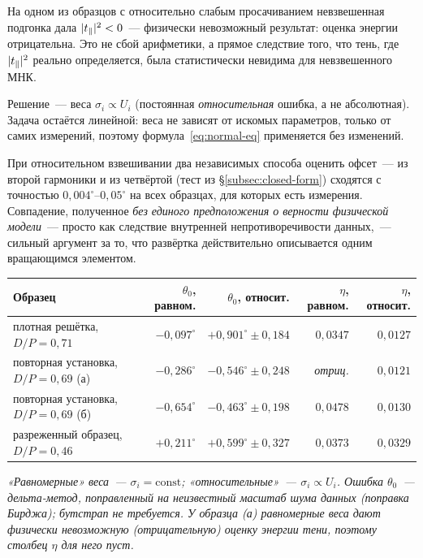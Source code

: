 \begin{example}
На одном из образцов с относительно слабым просачиванием невзвешенная подгонка дала
$|t_{\parallel}|^2<0$~--- физически невозможный результат: оценка энергии отрицательна. Это не сбой
арифметики, а прямое следствие того, что тень, где $|t_{\parallel}|^2$ реально определяется, была
статистически невидима для невзвешенного МНК.
\end{example}

\noindent
Решение~--- веса $\sigma_i\propto U_i$ (постоянная \emph{относительная} ошибка, а не абсолютная).
Задача остаётся линейной: веса не зависят от искомых параметров, только от самих измерений,
поэтому формула~\eqref{eq:normal-eq} применяется без изменений.

\begin{example}
При относительном взвешивании два независимых способа оценить офсет~--- из второй гармоники и из
четвёртой (тест из §\ref{subsec:closed-form}) сходятся с точностью
$0{,}004^\circ$--$0{,}05^\circ$ на всех образцах, для которых есть измерения. Совпадение,
полученное \emph{без единого предположения о верности физической модели}~--- просто как следствие
внутренней непротиворечивости данных,~--- сильный аргумент за то, что развёртка действительно
описывается одним вращающимся элементом.
\end{example}

\begin{center}
\footnotesize
\setlength{\tabcolsep}{6pt}
\begin{tabular}{@{}lrrrr@{}}
\toprule
\textbf{Образец} & \textbf{$\theta_0$, равном.} & \textbf{$\theta_0$, относит.} & \textbf{$\eta$,
равном.} & \textbf{$\eta$, относит.}\\
\midrule
плотная решётка, $D/P=0{,}71$        & $-0{,}097^\circ$ & $+0{,}901^\circ\pm0{,}184$ & $0{,}0347$ & $0{,}0127$ \\
повторная установка, $D/P=0{,}69$ (а) & $-0{,}286^\circ$ & $-0{,}546^\circ\pm0{,}248$ & \emph{отриц.} & $0{,}0121$ \\
повторная установка, $D/P=0{,}69$ (б) & $-0{,}654^\circ$ & $-0{,}463^\circ\pm0{,}198$ & $0{,}0478$ & $0{,}0130$ \\
разреженный образец, $D/P=0{,}46$    & $+0{,}211^\circ$ & $+0{,}599^\circ\pm0{,}327$ & $0{,}0373$ & $0{,}0329$ \\
\bottomrule
\end{tabular}
\end{center}
\noindent\emph{«Равномерные» веса~--- $\sigma_i=\mathrm{const}$; «относительные»~---
$\sigma_i\propto U_i$. Ошибка $\theta_0$~--- дельта-метод, поправленный на неизвестный масштаб
шума данных (поправка Бирджа); бутстрап не требуется. У образца (а) равномерные веса дают
физически невозможную (отрицательную) оценку энергии тени, поэтому столбец $\eta$ для него пуст.}

